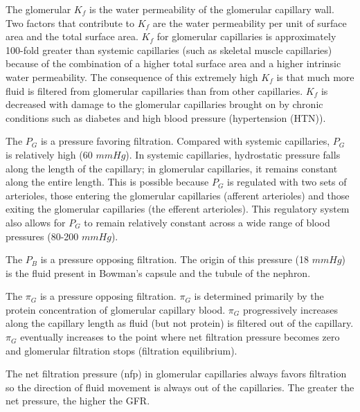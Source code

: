 The glomerular $K_f$  is the water permeability of the glomerular capillary wall. Two factors that contribute to $K_f$ are the water permeability per unit of surface area and the total surface area. $K_f$ for glomerular capillaries is approximately 100-fold greater than systemic capillaries (such as skeletal muscle capillaries) because of the combination of a higher total surface area and a higher intrinsic water permeability. The consequence of this extremely high $K_f$ is that much more fluid is filtered from glomerular capillaries than from other capillaries. $K_f$ is decreased with damage to the glomerular capillaries brought on by chronic conditions such as diabetes and high blood pressure (hypertension (HTN)).

The $P_{G}$ is a pressure favoring filtration.  Compared with systemic capillaries, $P_{G}$ is relatively high (60 $mm Hg$). In systemic capillaries, hydrostatic pressure falls along the length of the capillary; in glomerular capillaries, it remains constant along the entire length. This is possible because $P_{G}$ is regulated with two sets of arterioles, those entering the glomerular capillaries (afferent arterioles) and those exiting the glomerular capillaries (the efferent arterioles). This regulatory system also allows for $P_{G}$  to remain relatively constant across a wide range of blood pressures (80-200 $mm Hg$).

The $P_{B}$ is a pressure opposing filtration. The origin of this pressure (18 $mm Hg$) is the fluid present in Bowman’s capsule and the tubule of the nephron.

The $\pi_{G}$ is a pressure opposing filtration. $\pi_{G}$ is determined primarily by the protein concentration of glomerular capillary blood. $\pi_{G}$ progressively increases along the capillary length as fluid (but not protein) is filtered out of the capillary. $\pi_{G}$ eventually increases to the point where net filtration pressure becomes zero and glomerular filtration stops (filtration equilibrium). 

The net filtration pressure (nfp) in glomerular capillaries always favors filtration so the direction of fluid movement is always out of the capillaries. The greater the net pressure, the higher the GFR.


